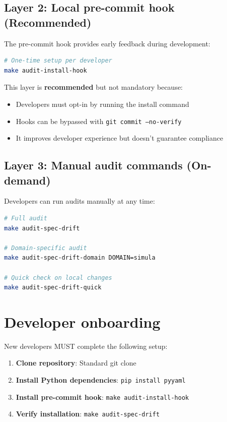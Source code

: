 \subsection{Layer 2: Local pre-commit hook (Recommended)}

The pre-commit hook provides early feedback during development:

\begin{lstlisting}[language=bash,caption=Pre-commit hook installation]
# One-time setup per developer
make audit-install-hook
\end{lstlisting}

This layer is \textbf{recommended} but not mandatory because:
\begin{itemize}
  \item Developers must opt-in by running the install command
  \item Hooks can be bypassed with \texttt{git commit --no-verify}
  \item It improves developer experience but doesn't guarantee compliance
\end{itemize}

\subsection{Layer 3: Manual audit commands (On-demand)}

Developers can run audits manually at any time:

\begin{lstlisting}[language=bash,caption=Manual audit commands]
# Full audit
make audit-spec-drift

# Domain-specific audit
make audit-spec-drift-domain DOMAIN=simula

# Quick check on local changes
make audit-spec-drift-quick
\end{lstlisting}

\section{Developer onboarding}
\label{sec:onboarding}

New developers MUST complete the following setup:

\begin{enumerate}
  \item \textbf{Clone repository}: Standard git clone
  \item \textbf{Install Python dependencies}: \texttt{pip install pyyaml}
  \item \textbf{Install pre-commit hook}: \texttt{make audit-install-hook}
  \item \textbf{Verify installation}: \texttt{make audit-spec-drift}
\end{enumerate}

